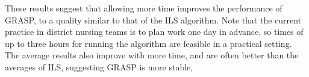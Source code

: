 \documentclass[a4paper,11pt]{elsarticle}
\begin{document}
These results suggest that allowing more time improves the performance of GRASP, to a quality similar to that of the ILS algorithm. Note that the current practice in district nursing teams is to plan work one day in advance, so times of up to three hours for running the algorithm are feasible in a practical setting. The average results also improve with more time, and are often better than the averages of ILS, suggesting GRASP is more stable, 
\end{document}
